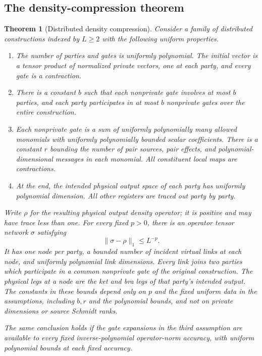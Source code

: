 \documentclass[11pt]{article}
\numberwithin{equation}{section}
\newtheorem{theorem}{Theorem}[section]
\theoremstyle{definition}
\theoremstyle{remark}
\newcommand{\norm}[1]{\lVert #1\rVert}
\begin{document}
\subsection{The density-compression theorem}

\begin{theorem}[Distributed density compression]
\label{thm:compression}
Consider a family of distributed constructions indexed by $L\ge2$ with
the following uniform properties.
\begin{enumerate}
\item The number of parties and gates is uniformly polynomial.  The
initial vector is a tensor product of normalized private vectors, one
at each party, and every gate is a contraction.
\item There is a constant $b$ such that each nonprivate gate involves at
most $b$ parties, and each party participates in at most $b$ nonprivate
gates over the entire construction.
\item Each nonprivate gate is a sum of uniformly polynomially many
allowed monomials with uniformly polynomially bounded scalar
coefficients.  There is a constant $r$ bounding the number of pair
sources, pair effects, and polynomial-dimensional messages in each
monomial.  All constituent local maps are contractions.
\item At the end, the intended physical output space of each party has
uniformly polynomial dimension.  All other registers are traced out
party by party.
\end{enumerate}
Write $\rho$ for the resulting physical output density operator; it is
positive and may have trace less than one.  For every fixed $p>0$, there
is an operator tensor network $\sigma$ satisfying
\[
 \norm{\sigma-\rho}_1\le L^{-p}.
\]
It has one node per party, a bounded number of incident virtual links at
each node, and uniformly polynomial link dimensions.  Every link joins
two parties which participate in a common nonprivate gate of the
original construction.  The physical legs at a node are the ket and bra
legs of that party's intended output.
The constants in these bounds depend only on $p$ and the fixed uniform
data in the assumptions, including $b,r$ and the polynomial bounds,
and not on private dimensions or source Schmidt ranks.

The same conclusion holds if the gate expansions in the third
assumption are available to every fixed inverse-polynomial
operator-norm accuracy, with uniform polynomial bounds at each fixed
accuracy.
\end{theorem}
\end{document}
